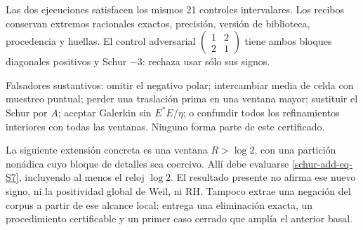 
Las dos ejecuciones satisfacen los mismos 21 controles intervalares.
Los recibos conservan extremos racionales exactos, precisión, versión
de biblioteca, procedencia y huellas. El control adversarial
\(\begin{pmatrix}1&2\\2&1\end{pmatrix}\) tiene ambos bloques
diagonales positivos y Schur \(-3\): rechaza usar sólo sus signos.

Falsadores sustantivos: omitir el negativo polar; intercambiar media
de celda con muestreo puntual; perder una traslación prima en una
ventana mayor; sustituir el Schur por \(A\); aceptar Galerkin sin
\(E^*E/\eta\); o confundir todos los refinamientos interiores con
todas las ventanas. Ninguno forma parte de este certificado.

La siguiente extensión concreta es una ventana \(R>\log2\), con
una partición nonádica cuyo bloque de detalles sea coercivo. Allí
debe evaluarse \eqref{schur-add-eq-S7}, incluyendo al menos el reloj \(\log2\).
El resultado presente no afirma ese nuevo signo, ni la positividad
global de Weil, ni RH. Tampoco extrae una negación del corpus a partir
de ese alcance local: entrega una eliminación exacta, un procedimiento
certificable y un primer caso cerrado que amplía el anterior basal.

